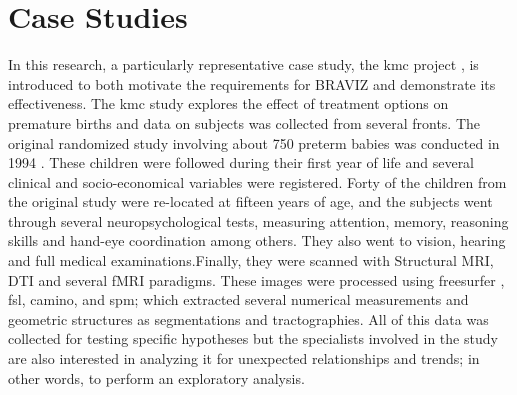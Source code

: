 \documentclass[twocolumn]{svjour3} %
\begin{document}
\section{Case Studies}

In this research, a particularly representative case study, the kmc project \cite{schneider_cerebral_2012}, is introduced to both motivate the requirements for BRAVIZ and demonstrate its effectiveness. The kmc study explores the effect of treatment options on premature births and data on subjects was collected from several fronts. The original randomized study involving about 750 preterm babies was conducted in 1994 \cite{charpak_kangaroo_1997}. These children were followed during their first year \cite{charpak_randomized_2001}\cite{tessier_kangaroo_2009} of life and several clinical and socio-economical variables were registered. Forty of the children from the original study were re-located at fifteen years of age, and the subjects went through several neuropsychological tests, measuring attention, memory, reasoning skills and hand-eye coordination among others. They also went to vision, hearing and full medical examinations.Finally, they were scanned with Structural MRI, DTI and several fMRI paradigms. These images were processed using freesurfer \cite{fischl_freesurfer_2012}, fsl\cite{jenkinson_fsl_2012}, camino\cite{cook_camino:_2006}, and spm\cite{friston_statistical_2006}; which extracted several numerical measurements and geometric structures as segmentations and tractographies. All of this data was collected for testing specific hypotheses but the specialists involved in the study are also interested in analyzing it for unexpected relationships and trends; in other words, to perform an exploratory analysis.
\end{document}
